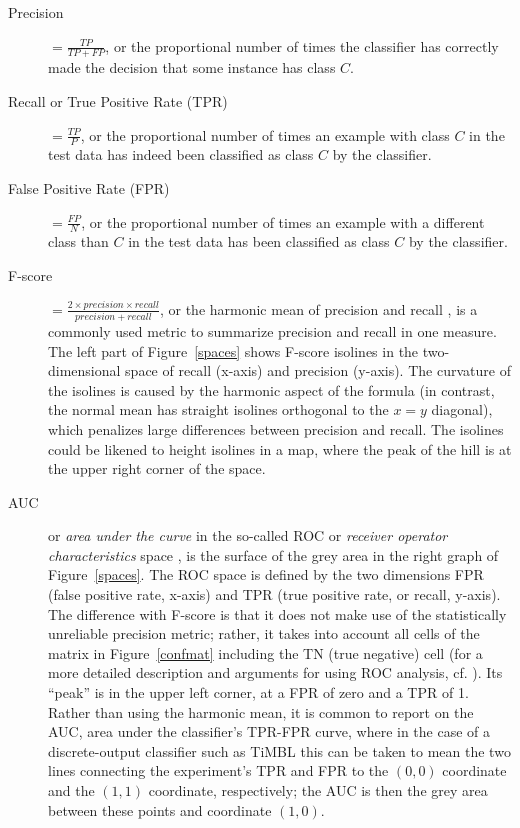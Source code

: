 \documentclass{book}
\begin{document}
\begin{description}
\item[Precision] $= \frac{TP}{TP+FP}$, or the
  proportional number of times the classifier has correctly made the
  decision that some instance has class $C$.

\item[Recall or True Positive Rate
  (TPR)] $=
  \frac{TP}{P}$, or the proportional number of times an example with
  class $C$ in the test data has indeed been classified as class $C$
  by the classifier.

\item[False Positive Rate (FPR)] $=
  \frac{FP}{N}$, or the proportional number of times an example with a
  different class than $C$ in the test data has been classified as
  class $C$ by the classifier.

\item[F-score] $= \frac{2 \times precision \times
  recall}{precision + recall}$, or the harmonic mean of precision and recall \cite{VanRijsbergen79}, is a commonly
  used metric to summarize precision and recall in one measure. The
  left part of Figure~\ref{spaces} shows F-score isolines in the
  two-dimensional space of recall (x-axis) and precision (y-axis). The
  curvature of the isolines is caused by the harmonic aspect of the
  formula (in contrast, the normal mean has straight isolines
  orthogonal to the $x=y$ diagonal), which penalizes large differences
  between precision and recall. The isolines could be likened to
  height isolines in a map, where the peak of the hill is at the upper
  right corner of the space.

\item [AUC] or {\em area under
  the curve}\/ in the so-called ROC or {\em receiver
  operator characteristics}\/
  space \cite{Egan75,Swets+00}, is the surface of the grey area in the
  right graph of Figure~\ref{spaces}. The ROC space is defined by the
  two dimensions FPR (false positive rate, x-axis) and TPR (true
  positive rate, or recall, y-axis). The difference with F-score is
  that it does not make use of the statistically unreliable precision
  metric; rather, it takes into account all cells of the matrix in
  Figure~\ref{confmat} including the TN (true negative) cell (for a
  more detailed description and arguments for using ROC analysis,
  cf. \cite{Fawcett04}). Its ``peak'' is in the upper left corner,
  at a FPR of zero and a TPR of 1. Rather than using the harmonic
  mean, it is common to report on the AUC, area under the classifier's
  TPR-FPR curve, where in the case of a discrete-output classifier
  such as {\sc TiMBL} this can be taken to mean the two lines
  connecting the experiment's TPR and FPR to the $(0,0)$ coordinate
  and the $(1,1)$ coordinate, respectively; the AUC is then the grey
  area between these points and coordinate $(1,0)$.

\end{description}
\end{document}
